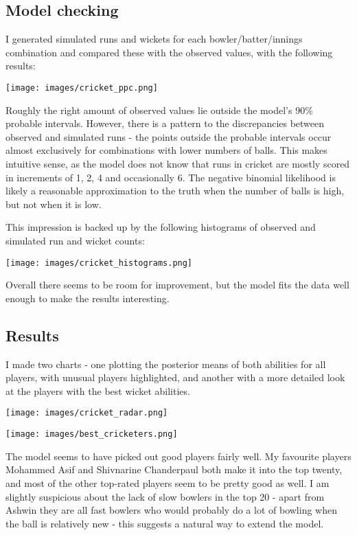 \documentclass[11pt]{article}
\begin{document}
\subsection*{Model checking}
\label{sec:orgd1018a5}
I generated simulated runs and wickets for each bowler/batter/innings
combination and compared these with the observed values, with the following
results:

\begin{center}
\texttt{[image: images/cricket\_ppc.png]}
\end{center}

Roughly the right amount of observed values lie outside the model's
90\% probable intervals. However, there is a pattern to the
discrepancies between observed and simulated runs - the points outside
the probable intervals occur almost exclusively for combinations with
lower numbers of balls. This makes intuitive sense, as the model does
not know that runs in cricket are mostly scored in increments of 1, 2,
4 and occasionally 6. The negative binomial likelihood is likely a
reasonable approximation to the truth when the number of balls is
high, but not when it is low.

This impression is backed up by the following histograms of observed
and simulated run and wicket counts:

\begin{center}
\texttt{[image: images/cricket\_histograms.png]}
\end{center}

Overall there seems to be room for improvement, but the model fits the
data well enough to make the results interesting.

\subsection*{Results}
\label{sec:org7f5f4df}
I made two charts - one plotting the posterior means of both abilities
for all players, with unusual players highlighted, and another with a
more detailed look at the players with the best wicket abilities.
\begin{center}
\texttt{[image: images/cricket\_radar.png]}
\end{center}

\begin{center}
\texttt{[image: images/best\_cricketers.png]}
\end{center}

The model seems to have picked out good players fairly well. My
favourite players Mohammed Asif and Shivnarine Chanderpaul both make
it into the top twenty, and most of the other top-rated players seem
to be pretty good as well. I am slightly suspicious about the lack of
slow bowlers in the top 20 - apart from Ashwin they are all fast
bowlers who would probably do a lot of bowling when the ball is
relatively new - this suggests a natural way to extend the model.
\end{document}
